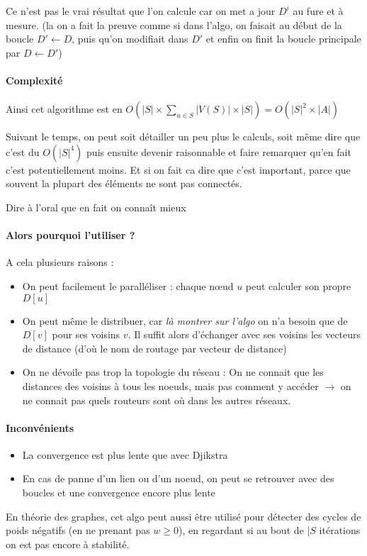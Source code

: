 \begin{com}
	Ce n'est pas le vrai résultat que l'on calcule car on met a jour $D^i$ au fure et à mesure. (la on a fait la preuve comme si dans l'algo, on faisait au début de la boucle $D'\gets D$, puis qu'on modifiait dans $D'$ et enfin on finit la boucle principale par $D \gets D'$)
\end{com}

\paragraph{Complexité} Ainsi cet algorithme est en $O(|S| \times \sum\limits_{u\in S} |V(S)| \times |S|)  =  O(|S|^2 \times |A|)$

\begin{com}
	Suivant le temps, on peut soit détailler un peu plus le calculs, soit même dire que c'est du $O(|S|^4)$ puis ensuite devenir raisonnable et faire remarquer qu'en fait c'est potentiellement moins. Et si on fait ca dire que c'est important, parce que souvent la plupart des éléments ne sont pas connectés.
\end{com}

\begin{com}
	Dire à l'oral que en fait on connaît mieux
\end{com}

\paragraph{Alors pourquoi l'utiliser ?} A cela plusieurs raisons :
\begin{itemize}
	\item On peut facilement le paralléliser : chaque nœud $u$ peut calculer son propre $D[u]$
	\item On peut même le distribuer, car \emph{là montrer sur l'algo} on n'a besoin que de $D[v]$ pour ses voisins $v$. Il suffit alors d'échanger avec ses voisins les vecteurs de distance (d'où le nom de routage par vecteur de distance)
	\item On ne dévoile pas trop la topologie du réseau : On ne connait que les distances des voisins à tous les noeuds, mais pas comment y accéder $\to$ on ne connait pas quels routeurs sont où dans les autres réseaux.
\end{itemize}

\paragraph{Inconvénients}\begin{itemize}
	\item La convergence est plus lente que avec Djikstra
	\item En cas de panne d'un lien ou d'un noeud, on peut se retrouver avec des boucles et une convergence encore plus lente
\end{itemize}

\begin{rem}
	En théorie des graphes, cet algo peut aussi être utilisé pour détecter des cycles de poids négatifs (en ne prenant pas $w\geq 0$), en regardant si au bout de $|S$ itérations on est pas encore à stabilité.
\end{rem}